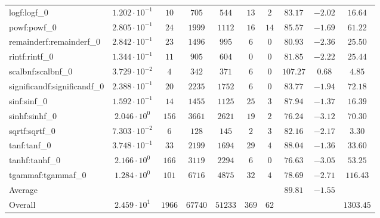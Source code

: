 \begin{tabular}{|l|c|c|c|c|c|c|c|c|c|}
logf:logf\_0                 & $ 1.202 \cdot 10^{-1} $ & $ 10     $ & $ 705   $ & $ 544   $ & $ 13  $ & $ 2  $ & $ 83.17       $ & $ -2.02   $ & $ 16.64   $ \\
powf:powf\_0                 & $ 2.805 \cdot 10^{-1} $ & $ 24     $ & $ 1999  $ & $ 1112  $ & $ 16  $ & $ 14 $ & $ 85.57       $ & $ -1.69   $ & $ 61.22   $ \\
remainderf:remainderf\_0     & $ 2.842 \cdot 10^{-1} $ & $ 23     $ & $ 1496  $ & $ 995   $ & $ 6   $ & $ 0  $ & $ 80.93       $ & $ -2.36   $ & $ 25.50   $ \\
rintf:rintf\_0               & $ 1.344 \cdot 10^{-1} $ & $ 11     $ & $ 905   $ & $ 604   $ & $ 0   $ & $ 0  $ & $ 81.85       $ & $ -2.22   $ & $ 25.44   $ \\
scalbnf:scalbnf\_0           & $ 3.729 \cdot 10^{-2} $ & $ 4      $ & $ 342   $ & $ 371   $ & $ 6   $ & $ 0  $ & $ 107.27      $ & $ 0.68    $ & $ 4.85    $ \\
significandf:significandf\_0 & $ 2.388 \cdot 10^{-1} $ & $ 20     $ & $ 2235  $ & $ 1752  $ & $ 6   $ & $ 0  $ & $ 83.77       $ & $ -1.94   $ & $ 72.18   $ \\
sinf:sinf\_0                 & $ 1.592 \cdot 10^{-1} $ & $ 14     $ & $ 1455  $ & $ 1125  $ & $ 25  $ & $ 3  $ & $ 87.94       $ & $ -1.37   $ & $ 16.39   $ \\
sinhf:sinhf\_0               & $ 2.046 \cdot 10^{0}  $ & $ 156    $ & $ 3661  $ & $ 2621  $ & $ 19  $ & $ 2  $ & $ 76.24       $ & $ -3.12   $ & $ 70.30   $ \\
sqrtf:sqrtf\_0               & $ 7.303 \cdot 10^{-2} $ & $ 6      $ & $ 128   $ & $ 145   $ & $ 2   $ & $ 3  $ & $ 82.16       $ & $ -2.17   $ & $ 3.30    $ \\
tanf:tanf\_0                 & $ 3.748 \cdot 10^{-1} $ & $ 33     $ & $ 2199  $ & $ 1694  $ & $ 29  $ & $ 4  $ & $ 88.04       $ & $ -1.36   $ & $ 33.60   $ \\
tanhf:tanhf\_0               & $ 2.166 \cdot 10^{0}  $ & $ 166    $ & $ 3119  $ & $ 2294  $ & $ 6   $ & $ 0  $ & $ 76.63       $ & $ -3.05   $ & $ 53.25   $ \\
tgammaf:tgammaf\_0           & $ 1.284 \cdot 10^{0}  $ & $ 101    $ & $ 6716  $ & $ 4875  $ & $ 32  $ & $ 4  $ & $ 78.69       $ & $ -2.71   $ & $ 116.43  $ \\
\hline
Average                      & $                     $ & $        $ & $       $ & $       $ & $     $ & $    $ & $ 89.81       $ & $ -1.55   $ & $         $ \\
\hline
Overall                      & $ 2.459 \cdot 10^{1}  $ & $ 1966   $ & $ 67740 $ & $ 51233 $ & $ 369 $ & $ 62 $ & $             $ & $         $ & $ 1303.45 $ \\
\hline
\end{tabular}
